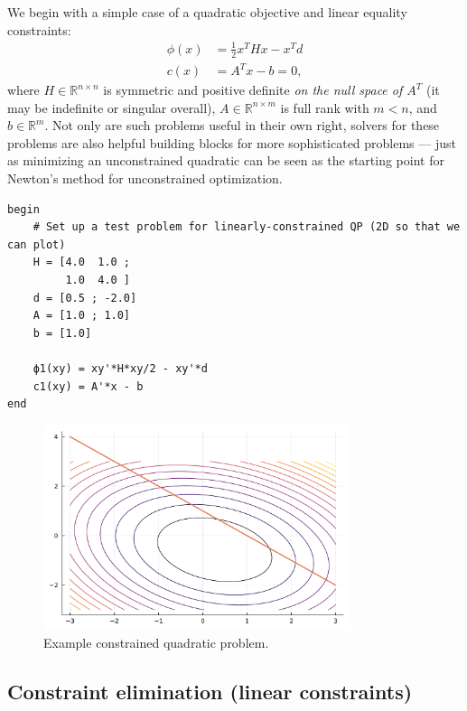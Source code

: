 \documentclass[12pt, leqno]{article} %
\begin{document}
We begin with a simple case of a quadratic objective and linear equality
constraints: \begin{align*}
  \phi(x) &= \frac{1}{2} x^T H x - x^T d \\
  c(x) &= A^T x-b = 0,
\end{align*} where \(H \in {\mathbb{R}}^{n \times n}\) is symmetric and
positive definite \emph{on the null space of \(A^T\)} (it may be
indefinite or singular overall), \(A \in {\mathbb{R}}^{n \times m}\) is
full rank with \(m < n\), and \(b \in {\mathbb{R}}^m\). Not only are
such problems useful in their own right, solvers for these problems are
also helpful building blocks for more sophisticated problems --- just as
minimizing an unconstrained quadratic can be seen as the starting point
for Newton's method for unconstrained optimization.

\begin{verbatim}
begin
    # Set up a test problem for linearly-constrained QP (2D so that we can plot)
    H = [4.0  1.0 ;
    	 1.0  4.0 ]
    d = [0.5 ; -2.0]
    A = [1.0 ; 1.0]
    b = [1.0]
    
    ϕ1(xy) = xy'*H*xy/2 - xy'*d
    c1(xy) = A'*x - b
end
\end{verbatim}

\begin{figure}
\begin{center}
\includegraphics[width=0.8\textwidth]{fig/2023-04-26-test-qp.pdf}
\end{center}
\caption{Example constrained quadratic problem.}
\label{fig:test-qp}
\end{figure}

\subsection{Constraint elimination (linear constraints)}
\end{document}
